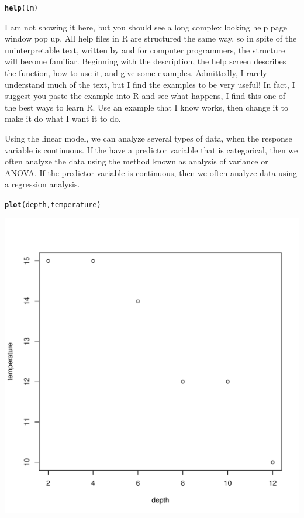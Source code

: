 \documentclass{tufte-handout}\usepackage[]{graphicx}\usepackage[]{xcolor}
\makeatletter
\def\maxwidth{ %
  \ifdim\Gin@nat@width>\linewidth
    \linewidth
  \else
    \Gin@nat@width
  \fi
}
\newcommand{\hlstd}[1]{\textcolor[rgb]{0.345,0.345,0.345}{#1}}%
\newcommand{\hlkwd}[1]{\textcolor[rgb]{0.737,0.353,0.396}{\textbf{#1}}}%
\newenvironment{kframe}{%
 \def\at@end@of@kframe{}%
 \ifinner\ifhmode%
  \def\at@end@of@kframe{\end{minipage}}%
  \begin{minipage}{\columnwidth}%
 \fi\fi%
 \def\FrameCommand##1{\hskip\@totalleftmargin \hskip-\fboxsep
 \colorbox{shadecolor}{##1}\hskip-\fboxsep
     \hskip-\linewidth \hskip-\@totalleftmargin \hskip\columnwidth}%
 \MakeFramed {\advance\hsize-\width
   \@totalleftmargin\z@ \linewidth\hsize
   \@setminipage}}%
 {\par\unskip\endMakeFramed%
 \at@end@of@kframe}
\newenvironment{knitrout}{}{} %
\makeatother
\begin{document}
\begin{knitrout}
\color{fgcolor}\begin{kframe}
\begin{alltt}
\hlkwd{help}\hlstd{(lm)}
\end{alltt}
\end{kframe}
\end{knitrout}

I am not showing it here, but you should see a long complex looking help page window pop up. All help files in R are structured the same way, so in spite of the uninterpretable text, written by and for computer programmers, the structure will become familiar. Beginning with the description, the help screen describes the function, how to use it, and give some examples. Admittedly, I rarely understand much of the text, but I find the examples to be very useful! In fact, I suggest you paste the example into R and see what happens, I find this one of the best ways to learn R. Use an example that I know works, then change it to make it do what I want it to do.

Using the linear model, we can analyze several types of data, when the response variable is continuous. If the have a predictor variable that is categorical, then we often analyze the data using the method known as analysis of variance or ANOVA. If the predictor variable is continuous, then we often analyze data using a regression analysis. 


\begin{knitrout}
\color{fgcolor}\begin{kframe}
\begin{alltt}
\hlkwd{plot}\hlstd{(depth, temperature)}
\end{alltt}
\end{kframe}
\includegraphics[width=\maxwidth]{figure/depth_v_temp-1} 
\end{knitrout}
\end{document}
